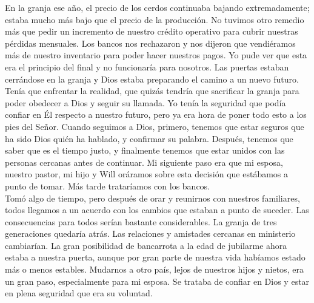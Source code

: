 \documentclass[twoside, 12pt]{book}
\begin{document}
En la granja ese año, el precio de los cerdos continuaba bajando extremadamente; estaba mucho más bajo que el precio de la producción. No tuvimos otro remedio más que pedir un incremento de nuestro crédito operativo para cubrir nuestras pérdidas mensuales. Los bancos nos rechazaron y nos dijeron que vendiéramos más de nuestro inventario para poder hacer nuestros pagos. Yo pude ver que esta era el principio del final y no funcionaría para nosotros. Las puertas estaban cerrándose en la granja y Dios estaba preparando el camino a un nuevo futuro. Tenía que enfrentar la realidad, que quizás tendría que sacrificar la granja para poder obedecer a Dios y seguir su llamada. Yo tenía la seguridad que podía confiar en Él respecto a nuestro futuro, pero ya era hora de poner todo esto a los pies del Señor. Cuando seguimos a Dios, primero, tenemos que estar seguros que ha sido Dios quién ha hablado, y confirmar su palabra. Después, tenemos que saber que es el tiempo justo, y finalmente tenemos que estar unidos con las personas cercanas antes de continuar. Mi siguiente paso era que mi esposa, nuestro pastor, mi hijo y Will oráramos sobre esta decisión que estábamos a punto de tomar. Más tarde trataríamos con los bancos.\\

Tomó algo de tiempo, pero después de orar y reunirnos con nuestros familiares, todos llegamos a un acuerdo con los cambios que estaban a punto de suceder. Las consecuencias para todos serían bastante considerables. La granja de tres generaciones quedaría atrás. Las relaciones y amistades cercanas en ministerio cambiarían. La gran posibilidad de bancarrota a la edad de jubilarme ahora estaba a nuestra puerta, aunque por gran parte de nuestra vida habíamos estado más o menos estables. Mudarnos a otro país, lejos de nuestros hijos y nietos, era un gran paso, especialmente para mi esposa. Se trataba de confiar en Dios y estar en plena seguridad que era su voluntad.\\
\end{document}
